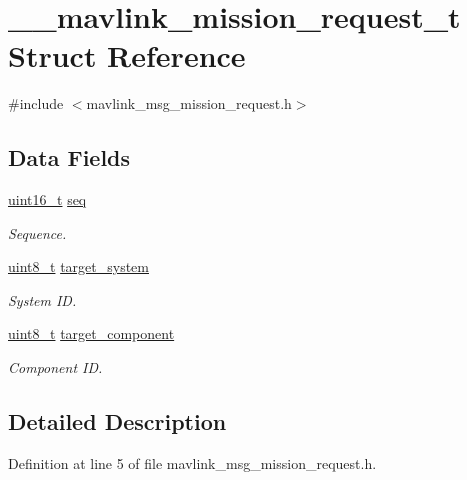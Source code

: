 \hypertarget{struct____mavlink__mission__request__t}{\section{\-\_\-\-\_\-mavlink\-\_\-mission\-\_\-request\-\_\-t Struct Reference}
\label{struct____mavlink__mission__request__t}
}


{\ttfamily \#include $<$mavlink\-\_\-msg\-\_\-mission\-\_\-request.\-h$>$}

\subsection*{Data Fields}
\begin{DoxyCompactItemize}
\item 
\hyperlink{stdint_8h_a273cf69d639a59973b6019625df33e30}{uint16\-\_\-t} \hyperlink{struct____mavlink__mission__request__t_adc8352db8e2a6dd3c5db6ec297e6d7ed}{seq}
\begin{DoxyCompactList}\small\item\em Sequence. \end{DoxyCompactList}\item 
\hyperlink{stdint_8h_aba7bc1797add20fe3efdf37ced1182c5}{uint8\-\_\-t} \hyperlink{struct____mavlink__mission__request__t_a8e2bdf5722c43082dfccd49839f7da43}{target\-\_\-system}
\begin{DoxyCompactList}\small\item\em System I\-D. \end{DoxyCompactList}\item 
\hyperlink{stdint_8h_aba7bc1797add20fe3efdf37ced1182c5}{uint8\-\_\-t} \hyperlink{struct____mavlink__mission__request__t_a3bef9f78c3256322231456b15601f1a6}{target\-\_\-component}
\begin{DoxyCompactList}\small\item\em Component I\-D. \end{DoxyCompactList}\end{DoxyCompactItemize}


\subsection{Detailed Description}


Definition at line 5 of file mavlink\-\_\-msg\-\_\-mission\-\_\-request.\-h.



